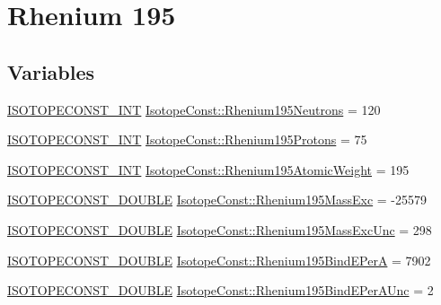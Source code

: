 \hypertarget{group___isotope_const-_rhenium-_re195}{}\section{Rhenium 195}
\label{group___isotope_const-_rhenium-_re195}
\subsection*{Variables}
\begin{DoxyCompactItemize}
\item 
\mbox{\hyperlink{group___isotope_const-_macros_ga5f18360b3e99483a35c32d789e62621c}{I\+S\+O\+T\+O\+P\+E\+C\+O\+N\+S\+T\+\_\+\+I\+NT}} \mbox{\hyperlink{group___isotope_const-_rhenium-_re195_ga8e0aac0002d121927f0d6770e9f8fdb1}{Isotope\+Const\+::\+Rhenium195\+Neutrons}} = 120
\item 
\mbox{\hyperlink{group___isotope_const-_macros_ga5f18360b3e99483a35c32d789e62621c}{I\+S\+O\+T\+O\+P\+E\+C\+O\+N\+S\+T\+\_\+\+I\+NT}} \mbox{\hyperlink{group___isotope_const-_rhenium-_re195_ga5c671d3072f1e6dd2d5cc8476d13da56}{Isotope\+Const\+::\+Rhenium195\+Protons}} = 75
\item 
\mbox{\hyperlink{group___isotope_const-_macros_ga5f18360b3e99483a35c32d789e62621c}{I\+S\+O\+T\+O\+P\+E\+C\+O\+N\+S\+T\+\_\+\+I\+NT}} \mbox{\hyperlink{group___isotope_const-_rhenium-_re195_ga4f8180b366e2cd3ce8116fcd08062edb}{Isotope\+Const\+::\+Rhenium195\+Atomic\+Weight}} = 195
\item 
\mbox{\hyperlink{group___isotope_const-_macros_ga8f45a7272ce02c0b4c65c44636ed719a}{I\+S\+O\+T\+O\+P\+E\+C\+O\+N\+S\+T\+\_\+\+D\+O\+U\+B\+LE}} \mbox{\hyperlink{group___isotope_const-_rhenium-_re195_ga9b0f607ce1008e84d2b2460aec54c277}{Isotope\+Const\+::\+Rhenium195\+Mass\+Exc}} = -\/25579
\item 
\mbox{\hyperlink{group___isotope_const-_macros_ga8f45a7272ce02c0b4c65c44636ed719a}{I\+S\+O\+T\+O\+P\+E\+C\+O\+N\+S\+T\+\_\+\+D\+O\+U\+B\+LE}} \mbox{\hyperlink{group___isotope_const-_rhenium-_re195_ga9f1119ddbf8894386bb37c77f35f6685}{Isotope\+Const\+::\+Rhenium195\+Mass\+Exc\+Unc}} = 298
\item 
\mbox{\hyperlink{group___isotope_const-_macros_ga8f45a7272ce02c0b4c65c44636ed719a}{I\+S\+O\+T\+O\+P\+E\+C\+O\+N\+S\+T\+\_\+\+D\+O\+U\+B\+LE}} \mbox{\hyperlink{group___isotope_const-_rhenium-_re195_gaf7c3cd465651f7f223cb3f5126482921}{Isotope\+Const\+::\+Rhenium195\+Bind\+E\+PerA}} = 7902
\item 
\mbox{\hyperlink{group___isotope_const-_macros_ga8f45a7272ce02c0b4c65c44636ed719a}{I\+S\+O\+T\+O\+P\+E\+C\+O\+N\+S\+T\+\_\+\+D\+O\+U\+B\+LE}} \mbox{\hyperlink{group___isotope_const-_rhenium-_re195_ga65f6839cf9646298f876d9aca2ee4aef}{Isotope\+Const\+::\+Rhenium195\+Bind\+E\+Per\+A\+Unc}} = 2

\end{DoxyCompactItemize}
